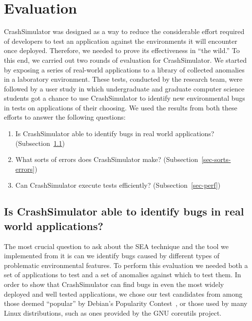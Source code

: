 \section{Evaluation}
\label{SEC:evaluation}

CrashSimulator was designed
as a way to reduce the considerable effort
required of developers to test an application
against the environments it will encounter once deployed.
Therefore,
we needed to prove its effectiveness in ``the wild.''
To this end,
we carried out two rounds of
evaluation for CrashSimulator.
We started by exposing
a series of real-world applications
to a library of collected anomalies in a laboratory environment.
These tests,
conducted by the research team,
were followed by a user study
in which undergraduate and graduate computer science students
got a chance to use CrashSimulator
to identify new environmental bugs
in tests on applications of their choosing.
We used the results from both these efforts
to answer the following questions:

\begin{enumerate}

\item{Is CrashSimulator able to identify bugs in real world applications?
    (Subsection~\ref{sec-env-bugs})}

\item{What sorts of errors does CrashSimulator make?
    (Subsection~\ref{sec-sorts-errors})}

\item{Can CrashSimulator
      execute tests efficiently? (Subsection~\ref{sec-perf})}

\end{enumerate}

\subsection{Is CrashSimulator able to identify bugs in real world
applications?}
\label{sec-env-bugs}

The most crucial question to ask about the SEA technique and the tool we implemented from it is can we
identify bugs
caused by different types of problematic environmental features.
To perform this evaluation we needed both a set of applications to test
and a set of anomalies against which to test them.
In order to show that CrashSimulator
can find bugs in even the most widely deployed
and well tested applications,
we chose our test candidates
from among those deemed ``popular''
by Debian's Popularity Contest~\cite{DebPopCon},
or those used
by many Linux distributions,
such as ones provided
by the GNU coreutils project.

